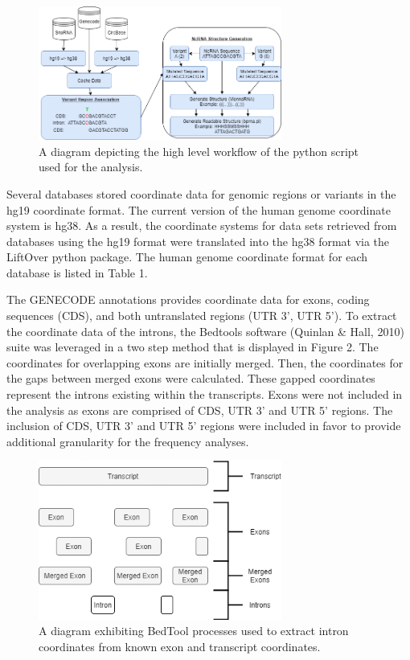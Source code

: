 \documentclass[11pt]{article}
\begin{document}
\begin{figure}[t]
	\centering
	\includegraphics[width=8cm]{workflow}
	\caption{A diagram depicting the high level workflow of the python script used for the analysis.
	}
	\label{fig:mesh1}
\end{figure}

Several databases stored coordinate data for genomic regions or variants in the hg19 coordinate format. The current version of the human genome coordinate system is hg38. As a result, the coordinate systems for data sets retrieved from databases using the hg19 format were translated into the hg38 format via the LiftOver python package. The human genome coordinate format for each database is listed in Table 1. 

The GENECODE annotations provides coordinate data for exons, coding sequences (CDS), and both untranslated regions (UTR 3’, UTR 5’). To extract the coordinate data of the introns, the Bedtools software (Quinlan & Hall, 2010) suite was leveraged in a two step method that is displayed in Figure 2. The coordinates for overlapping exons are initially merged. Then, the coordinates for the gaps between merged exons were calculated. These gapped coordinates represent the introns existing within the transcripts. Exons were not included in the analysis as exons are comprised of CDS, UTR 3’ and UTR 5’ regions. The inclusion of CDS, UTR 3’ and UTR 5’ regions were included in favor to provide additional granularity for the frequency analyses. 

\begin{figure}[t]
	\centering
	\includegraphics[width=8cm]{bed-tools}
	\caption{A diagram exhibiting BedTool processes used to extract intron coordinates from known exon and transcript coordinates.
	}
	\label{fig:mesh1}
\end{figure}
\end{document}
